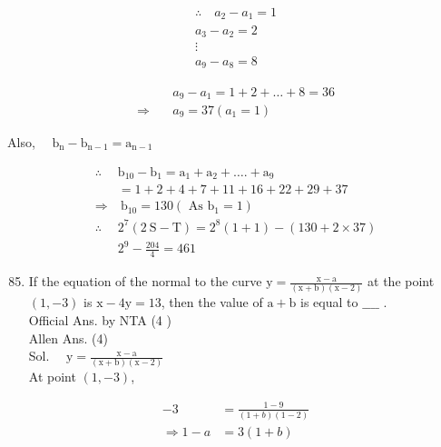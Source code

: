 \documentclass[10pt]{article}
\begin{document}
\[
\begin{gathered}
\therefore \quad a_{2}-a_{1}=1 \\
a_{3}-a_{2}=2 \\
\vdots \\
a_{9}-a_{8}=8
\end{gathered}
\]

\[
\begin{aligned}
& a_{9}-a_{1}=1+2+\ldots+8=36 \\
\Rightarrow \quad & a_{9}=37\left(a_{1}=1\right)
\end{aligned}
\]

Also, \(\quad \mathrm{b}_{\mathrm{n}}-\mathrm{b}_{\mathrm{n}-1}=\mathrm{a}_{\mathrm{n}-1}\)

\[
\begin{array}{ll}
\therefore & \mathrm{b}_{10}-\mathrm{b}_{1}=\mathrm{a}_{1}+\mathrm{a}_{2}+\ldots .+\mathrm{a}_{9} \\
& =1+2+4+7+11+16+22+29+37 \\
\Rightarrow & \mathrm{~b}_{10}=130\left(\text { As } \mathrm{b}_{1}=1\right) \\
\therefore & 2^{7}(2 \mathrm{~S}-\mathrm{T})=2^{8}(1+1)-(130+2 \times 37) \\
& 2^{9}-\frac{204}{4}=461
\end{array}
\]

\begin{enumerate}
  \setcounter{enumi}{84}
  \item If the equation of the normal to the curve \(\mathrm{y}=\frac{\mathrm{x}-\mathrm{a}}{(\mathrm{x}+\mathrm{b})(\mathrm{x}-2)}\) at the point \((1,-3)\) is \(\mathrm{x}-4 \mathrm{y}=13\), then the value of \(\mathrm{a}+\mathrm{b}\) is equal to \(\_\_\_\_\) .\\
Official Ans. by NTA (4 )\\
Allen Ans. (4)\\
Sol. \(\quad \mathrm{y}=\frac{\mathrm{x}-\mathrm{a}}{(\mathrm{x}+\mathrm{b})(\mathrm{x}-2)}\)\\
At point \((1,-3)\),
\end{enumerate}

\[
\begin{aligned}
-3 & =\frac{1-9}{(1+b)(1-2)} \\
\Rightarrow 1-a & =3(1+b)
\end{aligned}
\]
\end{document}
